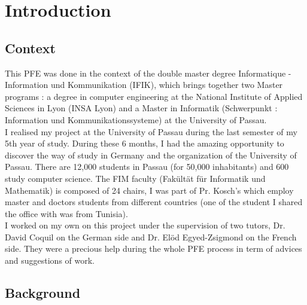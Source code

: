 \section{Introduction}
\subsection{Context} %
\label{sub:context}
This PFE was done in the context of the double master degree Informatique - Information und Kommunikation (IFIK), which brings together two Master programs : a degree in computer engineering at the National Institute of Applied Sciences in Lyon (INSA Lyon) and a Master in Informatik (Schwerpunkt : Information und Kommunikationssysteme) at the University of Passau.\\
I realised my project at the University of Passau during the last semester of my 5th year of study. During these 6 months, I had the amazing opportunity to discover the way of study in Germany and the organization of the University of Passau. There are 12,000 students in Passau (for 50,000 inhabitants) and 600 study computer science. The FIM faculty (Fakültät für Informatik und Mathematik) is composed of 24 chairs, I was part of Pr. Kosch's which employ master and doctors students from different countries (one of the student I shared the office with was from Tunisia).\\
I worked on my own on this project under the supervision of two tutors, Dr. David Coquil on the German side and Dr. Elöd Egyed-Zsigmond on the French side. They were a precious help during the whole PFE process in term of advices and suggestions of work.

\subsection{Background} %
\label{sub:background}

